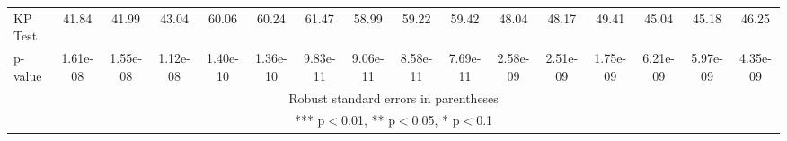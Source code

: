 \begin{tabular}{lccccccccccccccc}
KP Test & 41.84 & 41.99 & 43.04 & 60.06 & 60.24 & 61.47 & 58.99 & 59.22 & 59.42 & 48.04 & 48.17 & 49.41 & 45.04 & 45.18 & 46.25 \\
 p-value & 1.61e-08 & 1.55e-08 & 1.12e-08 & 1.40e-10 & 1.36e-10 & 9.83e-11 & 9.06e-11 & 8.58e-11 & 7.69e-11 & 2.58e-09 & 2.51e-09 & 1.75e-09 & 6.21e-09 & 5.97e-09 & 4.35e-09 \\ \hline
\multicolumn{16}{c}{ Robust standard errors in parentheses} \\
\multicolumn{16}{c}{ *** p$<$0.01, ** p$<$0.05, * p$<$0.1} \\
\end{tabular}
